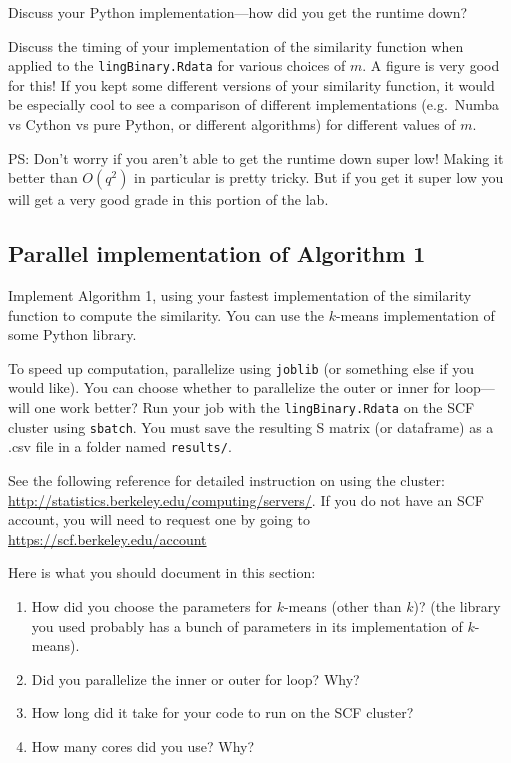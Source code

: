 \documentclass[letterpaper,12pt]{article}
\begin{document}
Discuss your Python implementation---how did you get the runtime down?

Discuss the timing of your implementation of the similarity function when applied to the \texttt{lingBinary.Rdata} for various choices of $m$. A figure is very good for this! If you kept some different versions of your similarity function, it would be especially cool to see a comparison of different implementations (e.g.~Numba vs Cython vs pure Python, or different algorithms) for different values of $m$.

PS: Don't worry if you aren't able to get the runtime down super low! Making it better than $O(q^2)$ in particular is pretty tricky. But if you get it super low you will get a very good grade in this portion of the lab.

\subsection{Parallel implementation of Algorithm 1}
Implement Algorithm 1, using your fastest implementation of the similarity function to compute the similarity. You can use the $k$-means implementation of some Python library.

To speed up computation, parallelize using \texttt{joblib} (or something else if you would like). You can choose whether to parallelize the outer or inner for loop---will one work better? Run your job with the \texttt{lingBinary.Rdata} on the SCF cluster using \texttt{sbatch}. You must save the resulting S matrix (or dataframe) as a .csv file in a folder named \texttt{results/}.

See the following reference for detailed instruction on using the cluster: \url{http://statistics.berkeley.edu/computing/servers/}. If you do not have an SCF account, you will need to request one by going to \url{https://scf.berkeley.edu/account}

Here is what you should document in this section:
\begin{enumerate}
    \item How did you choose the parameters for $k$-means (other than $k$)? (the library you used probably has a bunch of parameters in its implementation of $k$-means).
    \item Did you parallelize the inner or outer for loop? Why?
    \item How long did it take for your code to run on the SCF cluster?
    \item How many cores did you use? Why?
\end{enumerate}
\end{document}
